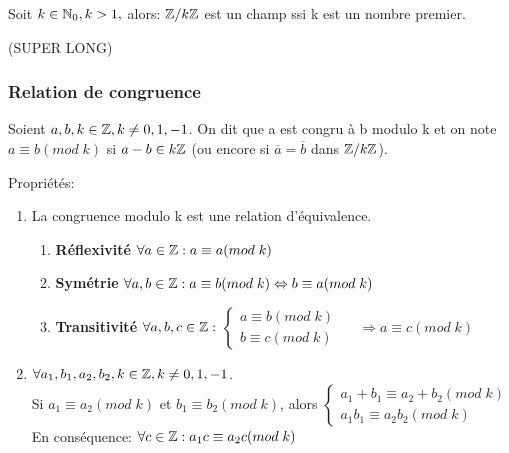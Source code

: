 \begin{prop}
Soit $k \in \mathbb{N}_0, k>1,$ alors: $\mathbb{Z}/k\mathbb{Z}$ est un champ ssi k est un nombre premier.
\end{prop}

\begin{demo}
(SUPER LONG)
\end{demo}

\subsubsection{Relation de congruence}

\begin{defn}
Soient $a,b,k \in \mathbb{Z}, k \neq 0,1,-1$. On dit que a est congru à b modulo k et on note $a \equiv b(mod\;k)$ si $a-b \in k\mathbb{Z}$ (ou encore si $\overline{a} = \overline{b}$ dans $\mathbb{Z}/k\mathbb{Z}$). \\
\end{defn}

Propriétés:

\begin{enumerate}
\item La congruence modulo k est une relation d'équivalence.
	\begin{enumerate}[-]
	\item \textbf{Réflexivité} $\forall a \in \mathbb{Z}: a \equiv a(mod\;k)$
	\item \textbf{Symétrie} $\forall a,b \in \mathbb{Z}: a \equiv b(mod\;k) \Leftrightarrow b \equiv a(mod\;k)$
	\item \textbf{Transitivité} $\forall a,b,c \in \mathbb{Z}:$
				$ \left\{\begin{matrix}
				a \equiv b(mod\;k)\\ 
				b \equiv c(mod\;k)
				\end{matrix}\right.$ $\quad \Rightarrow a\equiv c(mod\;k)$
	\end{enumerate}

\item $\forall a_1,b_1,a_2,b_2,k \in \mathbb{Z}, k\neq 0,1,-1$. \\
Si $a_1 \equiv a_2 (mod\;k)$ et $b_1 \equiv b_2 (mod\;k)$, alors $\left\{\begin{matrix}
					a_1 + b_1 \equiv a_2 + b_2 (mod\;k)\\ 
					a_1 b_1 \equiv a_2 b_2 (mod\;k)
					\end{matrix}\right.$\\
En conséquence: $\forall c\in \mathbb{Z}: a_1 c \equiv a_2 c(mod\;k)$
\end{enumerate}


